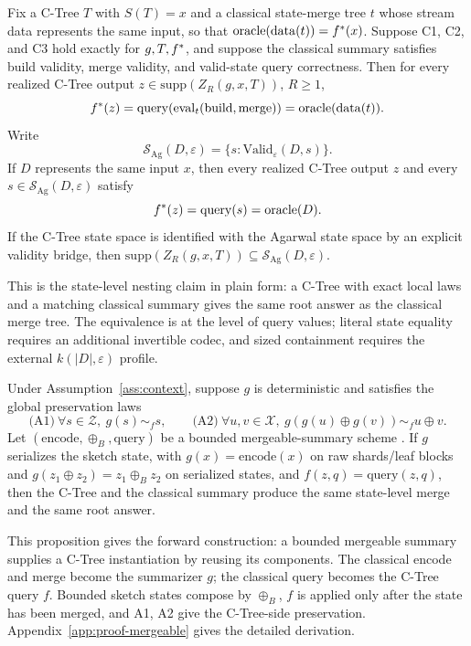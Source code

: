 \begin{proposition}
\label{prop:exact-query-equivalence}
Fix a C-Tree \(T\) with \(S(T)=x\) and a classical state-merge tree
\(t\) whose stream data represents the same input, so that
\(\mathrm{oracle}(\mathrm{data}(t))=f^\ast(x)\). Suppose C1, C2, and
C3 hold exactly for \(g,T,f^\ast\), and suppose the classical summary
satisfies build validity, merge validity, and valid-state query
correctness. Then for every realized C-Tree output
\(z\in\mathrm{supp}(Z_R(g,x,T))\), \(R\ge 1\),
\[
  f^\ast(z)
  =
  \mathrm{query}\!\left(\mathrm{eval}_t(\mathrm{build},\mathrm{merge})\right)
  =
  \mathrm{oracle}(\mathrm{data}(t)).
\]
Write
\[
  \mathcal{S}_{\mathrm{Ag}}(D,\varepsilon)
  =
  \{s:\mathrm{Valid}_{\varepsilon}(D,s)\}.
\]
If \(D\) represents the same input \(x\), then every realized C-Tree
output \(z\) and every
\(s\in\mathcal{S}_{\mathrm{Ag}}(D,\varepsilon)\) satisfy
\[
  f^\ast(z)=\mathrm{query}(s)=\mathrm{oracle}(D).
\]
If the C-Tree state space is identified with the Agarwal state space by
an explicit validity bridge, then
\(\mathrm{supp}(Z_R(g,x,T))\subseteq
\mathcal{S}_{\mathrm{Ag}}(D,\varepsilon)\).
\end{proposition}

This is the state-level nesting claim in plain form: a C-Tree with
exact local laws and a matching classical summary gives the same root
answer as the classical merge tree. The equivalence is at the
level of query values; literal state equality requires an additional
invertible codec, and sized containment requires the external
\(k(|D|,\varepsilon)\) profile.

\begin{proposition}
\label{prop:mergeable-reduction}
Under Assumption~\ref{ass:context}, suppose \(g\) is deterministic
and satisfies the global preservation laws
\[
\text{(A1)}\ \forall s\in\mathcal{Z},\ g(s)\sim_f s,\qquad
\text{(A2)}\ \forall u,v\in\mathcal{X},\
  g(g(u)\oplus g(v))\sim_f u\oplus v.
\]
Let \((\mathrm{encode},\oplus_B,\mathrm{query})\) be a bounded
mergeable-summary scheme \citep{Agarwal2013MergeableTODS}. If \(g\)
serializes the sketch state, with \(g(x)=\mathrm{encode}(x)\) on
raw shards/leaf blocks and \(g(z_1\oplus z_2)=z_1\oplus_B z_2\) on
serialized states, and \(f(z,q)=\mathrm{query}(z,q)\), then the C-Tree
and the classical summary produce the same state-level merge and the
same root answer.
\end{proposition}

This proposition gives the forward construction: a bounded mergeable
summary supplies a C-Tree instantiation by reusing its components.
The classical encode and merge become the summarizer \(g\); the
classical query becomes the C-Tree query \(f\). Bounded sketch states
compose by \(\oplus_B\), \(f\) is applied only after the state has
been merged, and A1, A2 give the C-Tree-side preservation.
Appendix~\ref{app:proof-mergeable} gives the detailed derivation.

